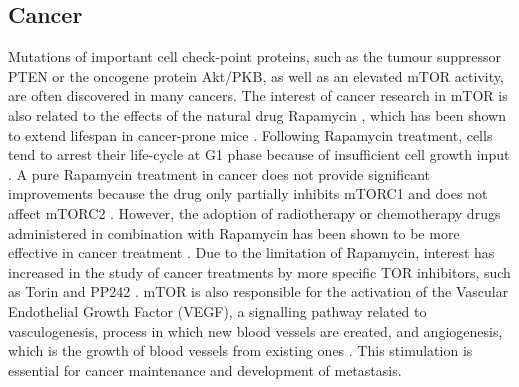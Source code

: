 \subsection{Cancer}
\label{subsec:Cancer}
Mutations of important cell check-point proteins, such as the tumour suppressor PTEN or the oncogene protein Akt/PKB, as well as an elevated mTOR activity, are often discovered in many cancers. The interest of cancer research in mTOR is also related to the effects of the natural drug Rapamycin \citep{Bjornsti2004}, which has been shown to extend lifespan in cancer-prone mice \citep{Anisimov2010}. Following Rapamycin treatment, cells tend to arrest their life-cycle at G1 phase because of insufficient cell growth input \citep{Bjornsti2004}. A pure Rapamycin treatment in cancer does not provide significant improvements because the drug only partially inhibits mTORC1 and does not affect mTORC2 \citep{Janes2010}. However, the adoption of radiotherapy or chemotherapy drugs administered in combination with Rapamycin has been shown to be more effective in cancer treatment \citep{Rosner2008}. Due to the limitation of Rapamycin, interest has increased in the study of cancer treatments by more specific TOR inhibitors, 
such as Torin and PP242 \citep{Janes2010, Liu2011, Feldman2009, Laplante2012}. mTOR is also responsible for the activation of the Vascular Endothelial Growth Factor (VEGF), a signalling pathway related to vasculogenesis, process in which new blood vessels are created, and angiogenesis, which is the growth of blood vessels from existing ones \citep{Treins2002}. This stimulation is essential for cancer maintenance and development of metastasis.

